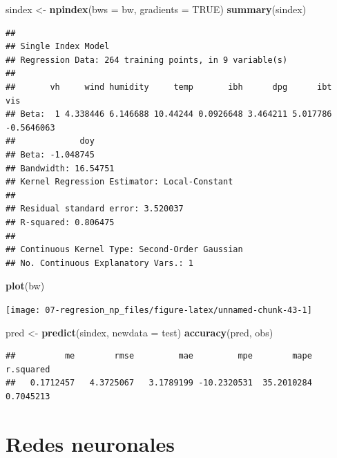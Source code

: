 \documentclass[
  spanish,
]{book}
\newenvironment{Shaded}{\begin{snugshade}}{\end{snugshade}}
\newcommand{\DataTypeTok}[1]{\textcolor[rgb]{0.13,0.29,0.53}{#1}}
\newcommand{\KeywordTok}[1]{\textcolor[rgb]{0.13,0.29,0.53}{\textbf{#1}}}
\newcommand{\NormalTok}[1]{#1}
\newcommand{\OtherTok}[1]{\textcolor[rgb]{0.56,0.35,0.01}{#1}}
\newcommand{\StringTok}[1]{\textcolor[rgb]{0.31,0.60,0.02}{#1}}
\theoremstyle{break}
\theoremstyle{definition}
\theoremstyle{definition}
\theoremstyle{definition}
\theoremstyle{remark}
\begin{document}
\begin{Shaded}
\begin{Highlighting}[]
\NormalTok{sindex <-}\StringTok{ }\KeywordTok{npindex}\NormalTok{(}\DataTypeTok{bws =}\NormalTok{ bw, }\DataTypeTok{gradients =} \OtherTok{TRUE}\NormalTok{)}
\KeywordTok{summary}\NormalTok{(sindex)}
\end{Highlighting}
\end{Shaded}

\begin{verbatim}
## 
## Single Index Model
## Regression Data: 264 training points, in 9 variable(s)
## 
##       vh     wind humidity     temp       ibh      dpg      ibt        vis
## Beta:  1 4.338446 6.146688 10.44244 0.0926648 3.464211 5.017786 -0.5646063
##             doy
## Beta: -1.048745
## Bandwidth: 16.54751
## Kernel Regression Estimator: Local-Constant
## 
## Residual standard error: 3.520037
## R-squared: 0.806475
## 
## Continuous Kernel Type: Second-Order Gaussian
## No. Continuous Explanatory Vars.: 1
\end{verbatim}

\begin{Shaded}
\begin{Highlighting}[]
\KeywordTok{plot}\NormalTok{(bw)}
\end{Highlighting}
\end{Shaded}

\begin{center}\texttt{[image: 07-regresion\_np\_files/figure-latex/unnamed-chunk-43-1]} \end{center}

\begin{Shaded}
\begin{Highlighting}[]
\NormalTok{pred <-}\StringTok{ }\KeywordTok{predict}\NormalTok{(sindex, }\DataTypeTok{newdata =}\NormalTok{ test)}
\KeywordTok{accuracy}\NormalTok{(pred, obs)}
\end{Highlighting}
\end{Shaded}

\begin{verbatim}
##          me        rmse         mae         mpe        mape   r.squared 
##   0.1712457   4.3725067   3.1789199 -10.2320531  35.2010284   0.7045213
\end{verbatim}

\hypertarget{neural-nets}{%
\chapter{Redes neuronales}\label{neural-nets}}
\end{document}
